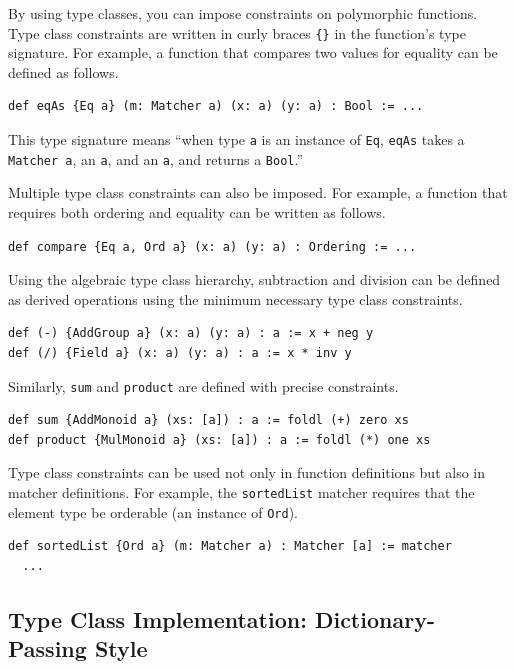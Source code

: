 By using type classes, you can impose constraints on polymorphic functions.
Type class constraints are written in curly braces \lstinline|{}| in the function's type signature.
For example, a function that compares two values for equality can be defined as follows.
\begin{lstlisting}[language=egison,numbers=none]
def eqAs {Eq a} (m: Matcher a) (x: a) (y: a) : Bool := ...
\end{lstlisting}
This type signature means ``when type \lstinline{a} is an instance of \lstinline{Eq}, \lstinline{eqAs} takes a \lstinline{Matcher a}, an \lstinline{a}, and an \lstinline{a}, and returns a \lstinline{Bool}.''

Multiple type class constraints can also be imposed.
For example, a function that requires both ordering and equality can be written as follows.
\begin{lstlisting}[language=egison,numbers=none]
def compare {Eq a, Ord a} (x: a) (y: a) : Ordering := ...
\end{lstlisting}

Using the algebraic type class hierarchy, subtraction and division can be defined as derived operations using the minimum necessary type class constraints.
\begin{lstlisting}[language=egison,numbers=none]
def (-) {AddGroup a} (x: a) (y: a) : a := x + neg y
def (/) {Field a} (x: a) (y: a) : a := x * inv y
\end{lstlisting}
Similarly, \lstinline{sum} and \lstinline{product} are defined with precise constraints.
\begin{lstlisting}[language=egison,numbers=none]
def sum {AddMonoid a} (xs: [a]) : a := foldl (+) zero xs
def product {MulMonoid a} (xs: [a]) : a := foldl (*) one xs
\end{lstlisting}

Type class constraints can be used not only in function definitions but also in matcher definitions.
For example, the \lstinline{sortedList} matcher requires that the element type be orderable (an instance of \lstinline{Ord}).
\begin{lstlisting}[language=egison,numbers=none]
def sortedList {Ord a} (m: Matcher a) : Matcher [a] := matcher
  ...
\end{lstlisting}

\subsection{Type Class Implementation: Dictionary-Passing Style}


